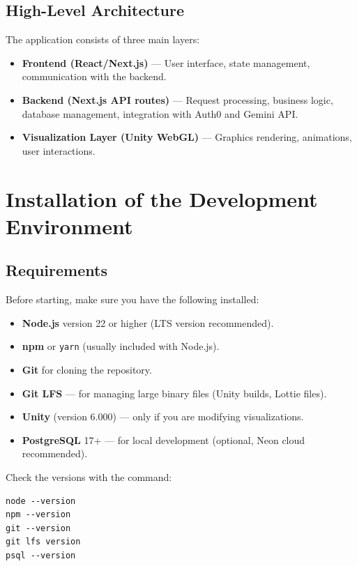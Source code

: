 \subsection{High-Level Architecture}

The application consists of three main layers:

\begin{itemize}
  \item \textbf{Frontend (React/Next.js)} — User interface, state management, communication with the backend.
  \item \textbf{Backend (Next.js API routes)} — Request processing, business logic, database management, integration with Auth0 and Gemini API.
  \item \textbf{Visualization Layer (Unity WebGL)} — Graphics rendering, animations, user interactions.
\end{itemize}

\section{Installation of the Development Environment}

\subsection{Requirements}

Before starting, make sure you have the following installed:
\begin{itemize}
  \item \textbf{Node.js} version 22 or higher (LTS version recommended).
  \item \textbf{npm} or \texttt{yarn} (usually included with Node.js).
  \item \textbf{Git} for cloning the repository.
  \item \textbf{Git LFS} — for managing large binary files (Unity builds, Lottie files).
  \item \textbf{Unity} (version 6.000) — only if you are modifying visualizations.
  \item \textbf{PostgreSQL} 17+ — for local development (optional, Neon cloud recommended).
\end{itemize}

Check the versions with the command:
\begin{verbatim}
node --version
npm --version
git --version
git lfs version
psql --version
\end{verbatim}


